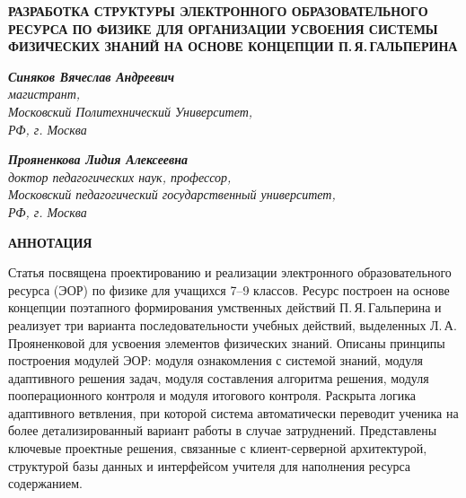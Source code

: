 \documentclass[14pt]{extarticle}
\begin{document}

\begin{center}
\textbf{РАЗРАБОТКА СТРУКТУРЫ ЭЛЕКТРОННОГО ОБРАЗОВАТЕЛЬНОГО РЕСУРСА ПО ФИЗИКЕ ДЛЯ ОРГАНИЗАЦИИ УСВОЕНИЯ СИСТЕМЫ ФИЗИЧЕСКИХ ЗНАНИЙ НА ОСНОВЕ КОНЦЕПЦИИ П.\,Я.\,ГАЛЬПЕРИНА}
\end{center}

\begin{flushright}
\textbf{\textit{Синяков Вячеслав Андреевич}}\\
\textit{магистрант,\\
Московский Политехнический Университет,\\
РФ, г. Москва}

\vspace{0.3cm}
\textbf{\textit{Прояненкова Лидия Алексеевна}}\\
\textit{доктор педагогических наук, профессор,\\
Московский педагогический государственный университет,\\
РФ, г. Москва}
\end{flushright}

\vspace{0.5cm}


\noindent\textbf{АННОТАЦИЯ}

\noindent
Статья посвящена проектированию и реализации электронного образовательного ресурса (ЭОР)
по физике для учащихся 7--9 классов. Ресурс построен на основе концепции поэтапного формирования
умственных действий П.\,Я.\,Гальперина и реализует три варианта последовательности учебных
действий, выделенных Л.\,А.\,Прояненковой для усвоения элементов физических знаний.
Описаны принципы построения модулей ЭОР: модуля ознакомления с системой знаний,
модуля адаптивного решения задач, модуля составления алгоритма решения, модуля пооперационного
контроля и модуля итогового контроля. Раскрыта логика адаптивного ветвления, при которой
система автоматически переводит ученика на более детализированный вариант работы в случае
затруднений. Представлены ключевые проектные решения, связанные с клиент-серверной
архитектурой, структурой базы данных и интерфейсом учителя для наполнения ресурса
содержанием.
\end{document}

